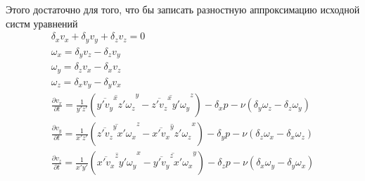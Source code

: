 Этого достаточно для того, что бы записать разностную аппроксимацию исходной систм уравнений
\begin{gather}
  \delta_x v_x + \delta_y v_y + \delta_z v_z = 0 
  \\
  \omega_x = \delta_y v_z - \delta_z v_y 
  \\
  \omega_y = \delta_z v_x - \delta_x v_z 
  \\
  \omega_z = \delta_x v_y - \delta_y v_x 
  \\
  \frac{\partial v_x}{\partial t} = \frac{1}{y'z'}\left(\overline{\overline{y'v_y}^x z' \omega_z}^y - \overline{\overline{z'v_z}^x y' \omega_y}^z \right) - \delta_x p - \nu (\delta_y \omega_z - \delta_z \omega_y)
  \\
  \frac{\partial v_y}{\partial t} = \frac{1}{x'z'}\left(\overline{\overline{z'v_z}^y x' \omega_x}^z - \overline{\overline{x'v_x}^y z' \omega_z}^x \right) - \delta_y p - \nu (\delta_z \omega_x - \delta_x \omega_z) 
  \\
  \frac{\partial v_z}{\partial t} = \frac{1}{x'y'}\left(\overline{\overline{x'v_x}^z y' \omega_y}^x - \overline{\overline{y'v_y}^z x' \omega_x}^y \right) - \delta_z p - \nu (\delta_x \omega_y - \delta_y \omega_x)
\end{gather}
